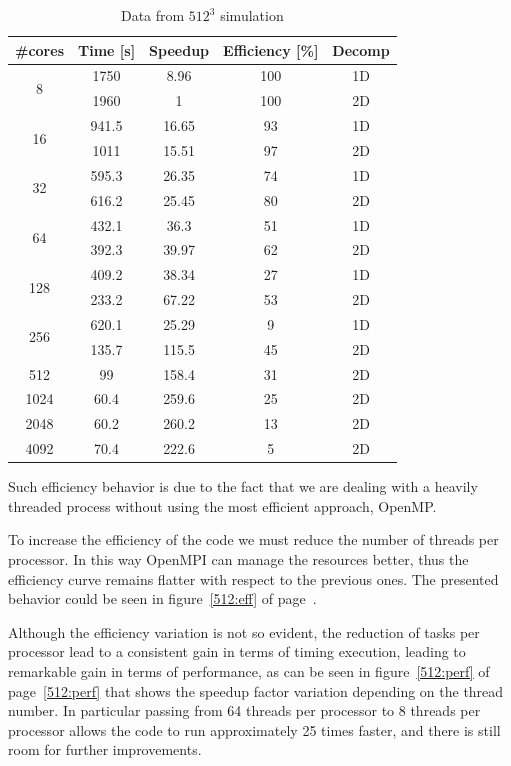 \begin{table}[h]
\caption{Data from $512^{3}$ simulation}
\begin{center}
\begin{tabular}{c c c c c}
\toprule
\textbf{\#cores} & \textbf{Time [s]} & \textbf{Speedup} & \textbf{Efficiency [\%]} & \textbf{Decomp}\\
\midrule
\multirow{2}{*}{8} & 1750 & 8.96 & 100 &1D\\
& 1960 & 1 & 100 & 2D\\
\hline
\multirow{2}{*}{16} & 941.5 & 16.65 & 93 & 1D\\
& 1011 & 15.51 & 97 & 2D\\
\hline
\multirow{2}{*}{32} & 595.3 & 26.35 & 74 & 1D\\
& 616.2 & 25.45 & 80 & 2D\\
\hline
\multirow{2}{*}{64} & 432.1 & 36.3 & 51 & 1D\\
& 392.3 & 39.97 & 62 & 2D\\
\hline
\multirow{2}{*}{128} & 409.2 & 38.34 & 27 & 1D\\
& 233.2 & 67.22 & 53 & 2D\\
\hline
\multirow{2}{*}{256} & 620.1 & 25.29 & 9 & 1D\\
& 135.7 & 115.5 & 45 & 2D\\
\hline
512 & 99 & 158.4 & 31 & 2D\\
1024 & 60.4 & 259.6 & 25  & 2D \\
2048 & 60.2 & 260.2 & 13  & 2D \\
4092 & 70.4 & 222.6 & 5 & 2D\\
\bottomrule
\end{tabular}
\end{center}
\label{512data}
\end{table}

Such efficiency behavior is due to the fact that we are dealing with a heavily threaded process without using the most efficient approach, OpenMP. \\
\par
To increase the efficiency of the code we must reduce the number of threads per processor. In this way OpenMPI can manage the resources better, thus the efficiency curve remains flatter with respect to the previous ones. The presented behavior could be seen in figure~\ref{512:eff} of page~\pageref{512:eff}.
\par
Although the efficiency variation is not so evident, the reduction of tasks per processor lead to a consistent gain in terms of timing execution, leading to remarkable gain in terms of performance, as can be seen in figure~\ref{512:perf} of page~\ref{512:perf} that shows the speedup factor variation depending on the thread number. In particular passing from 64 threads per processor to 8 threads per processor allows the code to run approximately 25 times faster, and there is still room for further improvements.


